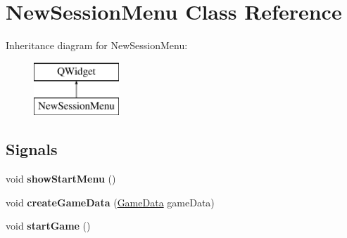 \hypertarget{classNewSessionMenu}{\section{New\-Session\-Menu Class Reference}
\label{classNewSessionMenu}
}
Inheritance diagram for New\-Session\-Menu\-:\begin{figure}[H]
\begin{center}
\leavevmode
\includegraphics[height=2.000000cm]{classNewSessionMenu}
\end{center}
\end{figure}
\subsection*{Signals}
\begin{DoxyCompactItemize}
\item 
\hypertarget{classNewSessionMenu_aec46b3d790d583bd0c0fb35a7cc89d58}{void {\bfseries show\-Start\-Menu} ()}\label{classNewSessionMenu_aec46b3d790d583bd0c0fb35a7cc89d58}

\item 
\hypertarget{classNewSessionMenu_add9c9c91b8f92fde390187463b1f40ba}{void {\bfseries create\-Game\-Data} (\hyperlink{classGameData}{Game\-Data} game\-Data)}\label{classNewSessionMenu_add9c9c91b8f92fde390187463b1f40ba}

\item 
\hypertarget{classNewSessionMenu_afa1a5423cfcb5af562e30d1f66040ce5}{void {\bfseries start\-Game} ()}\label{classNewSessionMenu_afa1a5423cfcb5af562e30d1f66040ce5}

\end{DoxyCompactItemize}
